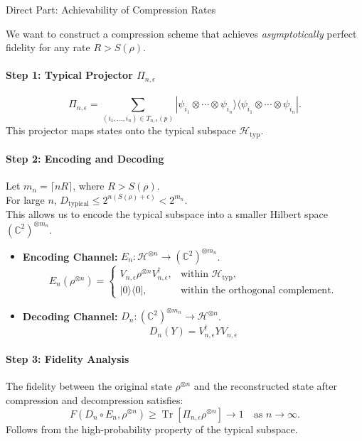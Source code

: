 Direct Part: Achievability of Compression Rates

We want to construct a compression scheme that achieves \textit{asymptotically} perfect fidelity for any rate \(R > S(\rho)\).

\paragraph{Step 1: Typical Projector \(\Pi_{n, \epsilon}\)}
\[
\Pi_{n, \epsilon} = \sum_{(i_1, \dots, i_n) \in T_{n, \epsilon}(p)} |\psi_{i_1} \otimes \cdots \otimes \psi_{i_n}\rangle \langle \psi_{i_1} \otimes \cdots \otimes \psi_{i_n}|.
\]
This projector maps states onto the typical subspace \(\mathcal{H}_{\text{typ}}\).

\paragraph{Step 2: Encoding and Decoding}

Let \(m_n = \lceil n R \rceil\), where \(R > S(\rho)\).
\\
For large \(n\), \(D_{\text{typical}} \leq 2^{n(S(\rho) + \epsilon)} < 2^{m_n}\). 
\\
This allows us to encode the typical subspace into a smaller Hilbert space \((\mathbb{C}^2)^{\otimes m_n}\).

\begin{itemize}
    \item \textbf{Encoding Channel:} \(E_n : \mathcal{H}^{\otimes n} \to (\mathbb{C}^2)^{\otimes m_n}\).
   \[
E_n(\rho^{\otimes n}) = 
\begin{cases}
    V_{n, \epsilon} \rho^{\otimes n} V_{n, \epsilon}^\dagger, & \text{within } \mathcal{H}_{\text{typ}}, \\
    |0\rangle\langle 0|, & \text{within the orthogonal complement}.
\end{cases}
\]

    \item \textbf{Decoding Channel:} \(D_n : (\mathbb{C}^2)^{\otimes m_n} \to \mathcal{H}^{\otimes n}\).
    \[
    D_n(Y) = V_{n, \epsilon}^\dagger Y V_{n, \epsilon}
    \]
\end{itemize}

\paragraph{Step 3: Fidelity Analysis}

The fidelity between the original state \(\rho^{\otimes n}\) and the reconstructed state after compression and decompression satisfies:
\[
F(D_n \circ E_n, \rho^{\otimes n}) \geq \operatorname{Tr}[\Pi_{n, \epsilon} \rho^{\otimes n}] \to 1 \quad \text{as } n \to \infty.
\]
Follows from the high-probability property of the typical subspace.

